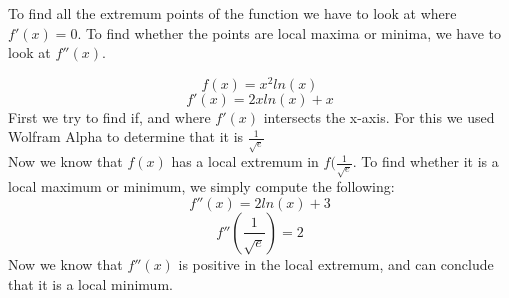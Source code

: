 To find all the extremum points of the function we have to look at where $f'(x) = 0$. To find whether the points are local maxima or minima, we have to look at $f''(x)$.

$$f(x) = x^2ln(x)$$
$$f'(x) = 2xln(x)+x$$
First we try to find if, and where $f'(x)$ intersects the x-axis. For this we used Wolfram Alpha to determine that it is $\frac{1}{\sqrt{e}}$\\
Now we know that $f(x)$ has a local extremum in $f(\frac{1}{\sqrt{e}}$. To find whether it is a local maximum or minimum, we simply compute the following:
$$f''(x) = 2ln(x)+3$$
$$f''(\frac{1}{\sqrt{e}}) = 2$$
Now we know that $f''(x)$ is positive in the local extremum, and can conclude that it is a local minimum.